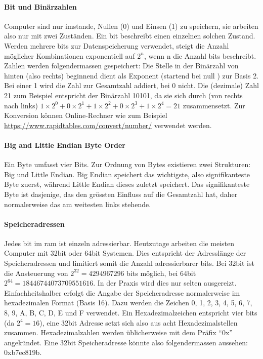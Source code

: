 \documentclass[11pt, a4paper]{article}
\begin{document}
\paragraph{Bit und Binärzahlen}
Computer sind nur imstande, Nullen (0) und Einsen (1) zu speichern, sie arbeiten also nur mit zwei Zuständen. Ein \gls{bit} beschreibt einen einzelnen solchen Zustand. Werden mehrere \glspl{bit} zur Datenspeicherung verwendet, steigt die Anzahl möglicher Kombinationen exponentiell auf \( 2^n \), wenn n die Anzahl \glspl{bit} beschreibt. Zahlen werden folgendermassen gespeichert: Die Stelle in der Binärzahl von hinten (also rechts) beginnend dient als Exponent (startend bei null ) zur Basis 2. Bei einer 1 wird die Zahl zur Gesamtzahl addiert, bei 0 nicht. Die (dezimale) Zahl 21 zum Beispiel entspricht der Binärzahl 10101, da sie sich durch (von rechts nach links) \(1 \times 2^0 + 0 \times 2^1 + 1 \times 2^2 + 0 \times 2^3 + 1 \times 2^4 = 21\) zusammensetzt. Zur Konversion können Online-Rechner wie zum Beispiel \url{https://www.rapidtables.com/convert/number/} verwendet werden.

\paragraph{Big and Little Endian Byte Order}
Ein Byte umfasst vier Bits. Zur Ordnung von Bytes existieren zwei Strukturen: Big und Little Endian. Big Endian speichert das wichtigste, also signifikanteste Byte zuerst, während Little Endian dieses zuletzt speichert. Das signifikanteste Byte ist dasjenige, das den grössten Einfluss auf die Gesamtzahl hat, daher normalerweise das am weitesten links stehende.

\paragraph{Speicheradressen}
Jedes \gls{bit} im \gls{ram} ist einzeln adressierbar. Heutzutage arbeiten die meisten Computer mit 32bit oder 64bit Systemen. Dies entspricht der Adresslänge der Speicheradressen und limitiert somit die Anzahl adressierbarer \glspl{bit}. Bei 32bit ist die Ansteuerung von \(2^32 = 4 294 967 296\) \glspl{bit} möglich, bei 64bit \(2^64 = 18 446 744 073 709 551 616\). In der Praxis wird dies nur selten ausgereizt. Einfachheitshalber erfolgt die Angabe der Speicheradresse normalerweise im hexadezimalen Format (Basis 16). Dazu werden die Zeichen 0, 1, 2, 3, 4, 5, 6, 7, 8, 9, A, B, C, D, E und F verwendet. Ein Hexadezimalzeichen entspricht vier \glspl{bit} (da \(2^4 = 16\)), eine 32bit Adresse setzt sich also aus acht Hexadezimalstellen zusammen. Hexadezimalzahlen werden üblicherweise mit dem Präfix ``0x'' angekündet. Eine 32bit Speicheradresse könnte also folgendermassen aussehen: 0xb7ec819b. \cite{BitWiki31:online}
\end{document}

